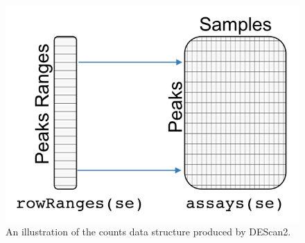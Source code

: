 \begin{figure}[H]
\centering
\includegraphics[keepaspectratio]{img/descan2/counts.png}
\caption[DEScan2 counts illustration]{An illustration of the counts data structure produced by DEScan2.}
\label{fig:countsdescan}
\centering
\end{figure}








